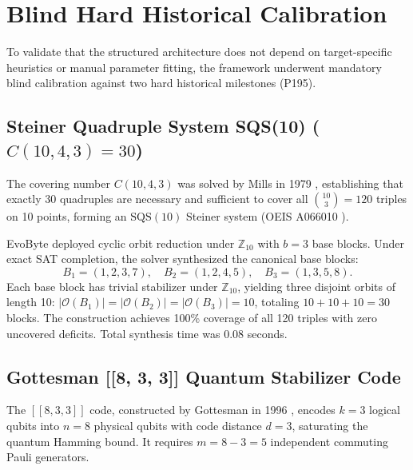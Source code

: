 \documentclass[11pt,a4paper]{article}
\begin{document}
\section{Blind Hard Historical Calibration}
\label{sec:calibration}

To validate that the structured architecture does not depend on target-specific heuristics or manual parameter fitting, the framework underwent mandatory blind calibration against two hard historical milestones (P195).

\subsection{Steiner Quadruple System SQS(10) ($C(10, 4, 3) = 30$)}
\label{sec:calib_sqs}
The covering number $C(10, 4, 3)$ was solved by Mills in 1979 \cite{mills1979sqs}, establishing that exactly 30 quadruples are necessary and sufficient to cover all $\binom{10}{3} = 120$ triples on 10 points, forming an $\text{SQS}(10)$ Steiner system (OEIS A066010 \cite{oeis2026a066010}).

EvoByte deployed cyclic orbit reduction under $\mathbb{Z}_{10}$ with $b=3$ base blocks. Under exact SAT completion, the solver synthesized the canonical base blocks:
\begin{equation}
\label{eq:sqs_bases}
B_1 = (1, 2, 3, 7), \quad B_2 = (1, 2, 4, 5), \quad B_3 = (1, 3, 5, 8).
\end{equation}
Each base block has trivial stabilizer under $\mathbb{Z}_{10}$, yielding three disjoint orbits of length 10: $|\mathcal{O}(B_1)| = |\mathcal{O}(B_2)| = |\mathcal{O}(B_3)| = 10$, totaling $10 + 10 + 10 = 30$ blocks. The construction achieves 100\% coverage of all 120 triples with zero uncovered deficits. Total synthesis time was 0.08 seconds.

\subsection{Gottesman [[8, 3, 3]] Quantum Stabilizer Code}
\label{sec:calib_gottesman}
The $[[8, 3, 3]]$ code, constructed by Gottesman in 1996 \cite{gottesman1996stabilizer}, encodes $k=3$ logical qubits into $n=8$ physical qubits with code distance $d=3$, saturating the quantum Hamming bound. It requires $m = 8 - 3 = 5$ independent commuting Pauli generators.
\end{document}
